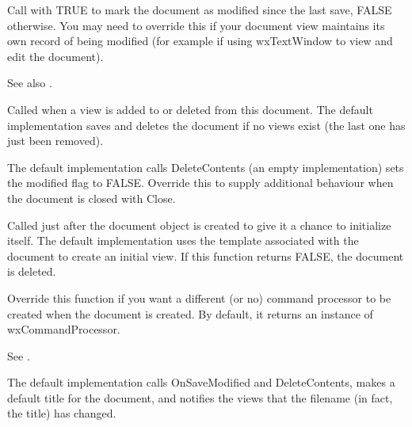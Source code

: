 \label{wxdocumentmodify}


Call with TRUE to mark the document as modified since the last save, FALSE otherwise.
You may need to override this if your document view maintains its own
record of being modified (for example if using wxTextWindow to view and edit the document).

See also .



Called when a view is added to or deleted from this document. The default
implementation saves and deletes the document if no views exist (the last
one has just been removed).



The default implementation calls DeleteContents (an empty implementation)
sets the modified flag to FALSE. Override this to
supply additional behaviour when the document is closed with Close.



Called just after the document object is created to give it a chance
to initialize itself. The default implementation uses the
template associated with the document to create an initial view.
If this function returns FALSE, the document is deleted.



Override this function if you want a different (or no) command processor
to be created when the document is created. By default, it returns
an instance of wxCommandProcessor.

See .



The default implementation calls OnSaveModified and DeleteContents, makes a default title for the
document, and notifies the views that the filename (in fact, the title) has changed.

